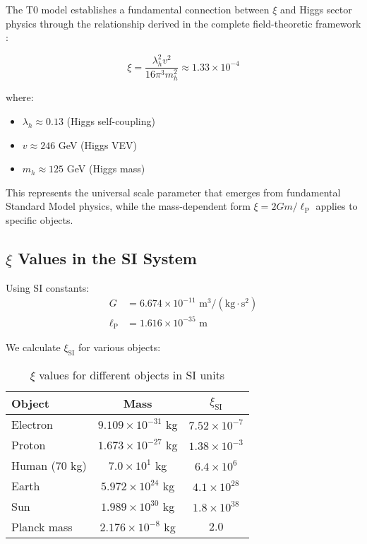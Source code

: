 \documentclass[12pt,a4paper]{article}
\newcommand{\xipar}{\xi}
\newcommand{\lP}{\ell_{\text{P}}}
\newcommand{\lambdah}{\lambda_h}
\newcommand{\pichar}{\pi}
\begin{document}
	The T0 model establishes a fundamental connection between $\xipar$ and Higgs sector physics through the relationship derived in the complete field-theoretic framework \cite{pascher_derivation_beta_2025}:
	
	\begin{equation}
		\xipar = \frac{\lambdah^2 v^2}{16\pichar^3 m_h^2} \approx 1.33 \times 10^{-4}
		\label{eq:xi_higgs_fundamental}
	\end{equation}
	
	where:
	\begin{itemize}
		\item $\lambdah \approx 0.13$ (Higgs self-coupling)
		\item $v \approx 246$ GeV (Higgs VEV)
		\item $m_h \approx 125$ GeV (Higgs mass)
	\end{itemize}
	
	This represents the universal scale parameter that emerges from fundamental Standard Model physics, while the mass-dependent form $\xipar = 2Gm/\lP$ applies to specific objects.
	
	\subsection{$\xipar$ Values in the SI System}
	\label{subsec:xi_si_values}
	
	Using SI constants:
	\begin{align}
		G &= 6.674 \times 10^{-11} \text{ m}^3/(\text{kg} \cdot \text{s}^2) \\
		\lP &= 1.616 \times 10^{-35} \text{ m}
	\end{align}
	
	We calculate $\xipar_{\text{SI}}$ for various objects:
	
	\begin{table}[htbp]
		\centering
		\begin{tabular}{lcc}
			\toprule
			\textbf{Object} & \textbf{Mass} & \textbf{$\xipar_{\text{SI}}$} \\
			\midrule
			Electron & $9.109 \times 10^{-31}$ kg & $7.52 \times 10^{-7}$ \\
			Proton & $1.673 \times 10^{-27}$ kg & $1.38 \times 10^{-3}$ \\
			Human (70 kg) & $7.0 \times 10^{1}$ kg & $6.4 \times 10^{6}$ \\
			Earth & $5.972 \times 10^{24}$ kg & $4.1 \times 10^{28}$ \\
			Sun & $1.989 \times 10^{30}$ kg & $1.8 \times 10^{38}$ \\
			Planck mass & $2.176 \times 10^{-8}$ kg & $2.0$ \\
			\bottomrule
		\end{tabular}
		\caption{$\xipar$ values for different objects in SI units}
		\label{tab:xi_si_values}
	\end{table}
	
\end{document}
